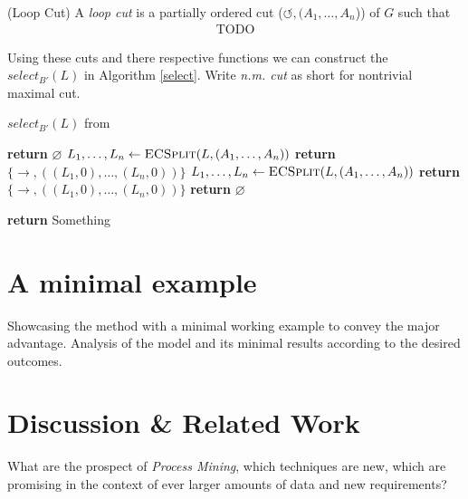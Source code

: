 \documentclass[a4paper]{IEEEtran}
\begin{document}
\begin{defn} (Loop Cut)
A \textit{loop cut} is a partially ordered cut ($\circlearrowleft,( A_1, \dots, A_n$)) of $G$ such that
\begin{align*}
\text{TODO}
\end{align*}
\end{defn}

Using these cuts and there respective  functions we can construct the $select_{B'}(L)$ in Algorithm \ref{select}. Write \textit{n.m. cut} as short for nontrivial maximal cut.

\begin{algorithm}[h!]
\caption{$select_{B'}(L)$ from \cite{inductivemining-constructive}}
\begin{algorithmic}[1]
    \State \textbf{return} $\varnothing$
\EndIf
{}
    \State $L_1, \dots, L_n \gets \Call{ECSplit}{L, (A_1, \dots, A_n)} $
    \State \textbf{return} $\{\rightarrow, ((L_1, 0), \dots, (L_n, 0))\}$
\EndIf
{}
    \State $L_1, \dots, L_n \gets \Call{ECSplit}{L, (A_1, \dots, A_n)} $
    \State \textbf{return} $\{\rightarrow, ((L_1, 0), \dots, (L_n, 0))\}$
\EndIf
\State \textbf{return} $\varnothing$

\State \textbf{return} Something
\end{algorithmic}
\label{select}
\end{algorithm}

\section{A minimal example}
\label{sec:example}
Showcasing the method with a minimal working example to convey the major advantage. Analysis of the model and its minimal results according to the desired outcomes. 


\section{Discussion \& Related Work}
\label{sec:related}
What are the prospect of \textit{Process Mining}, which techniques are new, which are promising in the context of ever larger amounts of data and new requirements?



\end{document}
